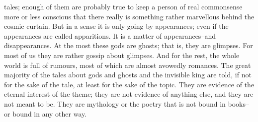 tales; enough of them are probably true to keep a person of real commonsense more or less conscious that there really is something rather marvellous behind the cosmic curtain. But in a sense it is only going by appearances; even if the appearances are called apparitions. It is a matter of appearances--and disappearances. At the most these gods are ghosts; that is, they are glimpses. For most of us they are rather gossip about glimpses. And for the rest, the whole world is full of rumours, most of which are almost avowedly romances. The great majority of the tales about gods and ghosts and the invisible king are told, if not for the sake of the tale, at least for the sake of the topic. They are evidence of the eternal interest of the theme; they are not evidence of anything else, and they are not meant to be. They are mythology or the poetry that is not bound in books-- or bound in any other way.

